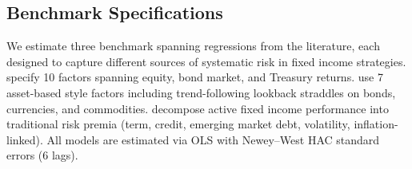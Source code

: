 

\subsection{Benchmark Specifications}
\label{sec:bench_specs}

We estimate three benchmark spanning regressions from the literature,
each designed to capture different sources of systematic risk in fixed
income strategies. \citet{duarte2007risk} specify 10 factors spanning
equity, bond market, and Treasury returns.
\citet{fung2004hedge} use 7 asset-based style factors including
trend-following lookback straddles on bonds, currencies, and commodities.
\citet{brooks2020active} decompose active fixed income performance into
traditional risk premia (term, credit, emerging market debt, volatility,
inflation-linked). All models are estimated via OLS with Newey--West HAC
standard errors (6 lags).


